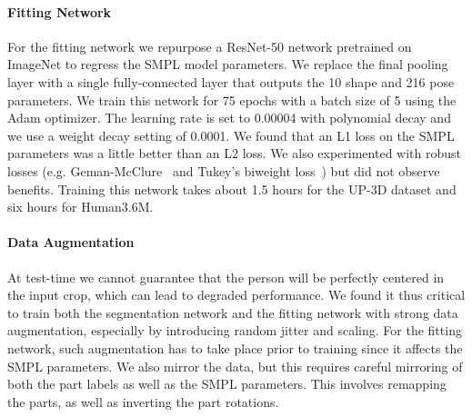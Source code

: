 \documentclass[10pt,twocolumn,letterpaper]{article}
\begin{document}
\paragraph{Fitting Network} For the fitting network we repurpose a ResNet-50 network pretrained on ImageNet to regress
the SMPL model parameters. We replace the final pooling layer with a single fully-connected
layer that outputs the 10 shape and 216 pose parameters. We train this network for 75 epochs with a 
batch size of 5 using the Adam optimizer. The learning rate is set to 0.00004 with polynomial decay 
and we use a weight decay setting of 0.0001. We found that an L1 loss on the SMPL parameters was
a little better than an L2 loss. We also experimented with robust losses (e.g. Geman-McClure~ 
and Tukey's biweight loss~) but did not observe benefits. Training this network takes 
about 1.5 hours for the UP-3D dataset and six hours for Human3.6M.
\vspace{-0.5em}
\paragraph{Data Augmentation} At test-time we cannot guarantee that the person will be perfectly centered in the input crop,
which can lead to degraded performance. We found it thus critical to train both the segmentation network and the fitting network
with strong data augmentation, especially by introducing random jitter and scaling. For the fitting network, 
such augmentation has to take place prior to training since it affects the SMPL parameters. We also mirror the data, but this
requires careful mirroring of both the part labels as well as the SMPL parameters. This involves remapping the parts, 
as well as inverting the part rotations.



\end{document}

